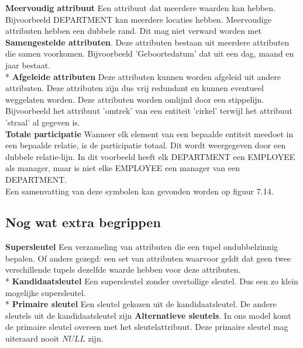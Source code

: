 \documentclass[10pt]{article}
\begin{document}
\textbf{Meervoudig attribuut} Een attribuut dat meerdere waarden kan hebben. Bijvoorbeeld DEPARTMENT kan meerdere locaties hebben. Meervoudige attributen hebben een dubbele rand. Dit mag niet verward worden met \textbf{Samengestelde attributen}. Deze attributen bestaan uit meerdere attributen die samen voorkomen. Bijvoorbeeld 'Geboortedatum' dat uit een dag, maand en jaar bestaat.\\*
\textbf{Afgeleide attributen} Deze attributen kunnen worden afgeleid uit andere attributen. Deze attributen zijn dus vrij redundant en kunnen eventueel weggelaten worden. Deze attributen worden omlijnd door een stippelijn. Bijvoorbeeld het attribuut 'omtrek' van een entiteit 'cirkel' terwijl het attribuut 'straal' al gegeven is.\\
\textbf{Totale participatie} Wanneer elk element van een bepaalde entiteit meedoet in een bepaalde relatie, is de participatie totaal. Dit wordt weergegeven door een dubbele relatie-lijn. In dit voorbeeld heeft elk DEPARTMENT een EMPLOYEE als manager, maar is niet elke EMPLOYEE een manager van een DEPARTMENT.\\
Een samenvatting van deze symbolen kan gevonden worden op figuur 7.14.

\subsection{Nog wat extra begrippen}
\textbf{Supersleutel} Een verzameling van attributen die een tupel ondubbelzinnig bepalen. Of anders gezegd: een set van attributen waarvoor geldt dat geen twee verschillende tupels dezelfde waarde hebben voor deze attributen.\\*
\textbf{Kandidaatsleutel} Een supersleutel zonder overtollige sleutel. Dus een zo klein mogelijke supersleutel.\\*
\textbf{Primaire sleutel} Een sleutel gekozen uit de kandidaatsleutel. De andere sleutels uit de kandidaatsleutel zijn \textbf{Alternatieve sleutels}. In ons model komt de primaire sleutel overeen met het sleutelattribuut. Deze primaire sleutel mag uiteraard nooit $NULL$ zijn.
\end{document}
